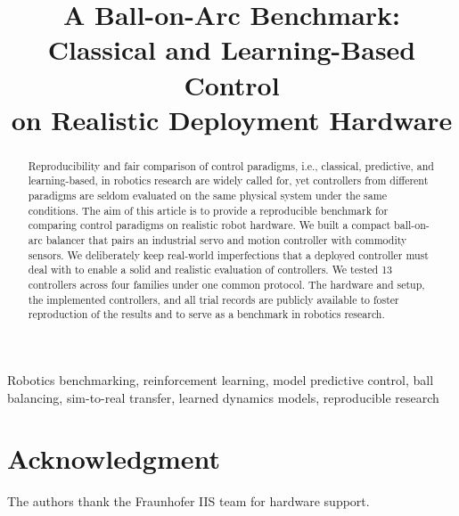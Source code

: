 \documentclass[]{IEEEtran}
\begin{document}
\title{A Ball-on-Arc Benchmark: Classical and Learning-Based Control\\on Realistic Deployment Hardware}

\author{
}


\maketitle

\begin{abstract}
Reproducibility and fair comparison of control paradigms, i.e., classical,
predictive, and learning-based, in robotics research are widely called for,
yet controllers from different paradigms are seldom evaluated on the same
physical system under the same conditions. The aim of this article is to
provide a reproducible benchmark for comparing control paradigms on realistic
robot hardware. We built a compact ball-on-arc balancer that pairs an
industrial servo and motion controller with commodity sensors. We deliberately
keep real-world imperfections that a deployed controller must deal with to
enable a solid and realistic evaluation of controllers. We tested 13
controllers across four families under one common protocol. The hardware and
setup, the implemented controllers, and all trial records are publicly
available to foster reproduction of the results and to serve as a benchmark in
robotics research.
\end{abstract}

\begin{IEEEkeywords}
Robotics benchmarking, reinforcement learning, model predictive control,
ball balancing, sim-to-real transfer, learned dynamics models,
reproducible research
\end{IEEEkeywords}









\section*{Acknowledgment}
The authors thank the Fraunhofer IIS team for hardware support.



\end{document}

